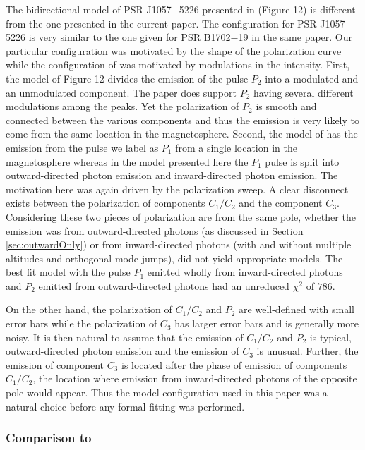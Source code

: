 The bidirectional model of PSR J1057$-$5226 presented in \cite{weltevrede2007main} 
(Figure 12) is different from the one presented in
the current paper.  The configuration for PSR J1057$-$5226 is very similar to
the one given for PSR B1702$-$19 in the same paper.  Our particular
configuration was motivated by the shape of the polarization curve while
the configuration of \cite{weltevrede2007main} was motivated by modulations
in the intensity.  First, the model of \cite{weltevrede2007main} Figure 12
divides the emission of the pulse $P_2$ into a modulated and an
unmodulated component.  The paper \cite{weltevrede2012phase} does support
$P_2$ having several different modulations among the peaks.  Yet the
polarization of $P_2$ is smooth and connected between the various
components and thus the emission is very likely to come from the same
location in the magnetosphere.  Second, the model of \cite{weltevrede2007main} 
has the emission from the pulse we label as $P_1$ from a single
location in the magnetosphere whereas in the model presented here
the $P_1$ pulse is split into outward-directed photon emission and
inward-directed photon emission.  The motivation here was again driven
by the polarization sweep.  A clear disconnect exists between the
polarization of components $C_1/C_2$ and the component $C_3$.  Considering these two pieces of
polarization are from the same pole, whether the emission was from
outward-directed photons (as discussed in Section \ref{sec:outwardOnly}) or from
inward-directed photons (with and without multiple altitudes and
orthogonal mode jumps), did not yield appropriate models.  The best fit
model with the pulse $P_1$ emitted wholly from inward-directed photons and
$P_2$ emitted from outward-directed photons had an unreduced $\chi^2$ of $786$.  

On the other hand, the polarization of $C_1/C_2$ and $P_2$ are well-defined with
small error bars while the polarization of $C_3$ has
larger error bars and is generally more noisy.  It is
then natural to assume that the emission of $C_1/C_2$ and $P_2$ is typical,
outward-directed photon emission and the emission of $C_3$ is unusual.
Further, the emission of component $C_3$ is located after the phase of
emission of components $C_1/C_2$, the location where emission from
inward-directed photons of the opposite pole would appear.  Thus the
model configuration used in this paper was a natural choice before any
formal fitting was performed.


\subsubsection{Comparison to \cite{weltevrede2009mapping}}

